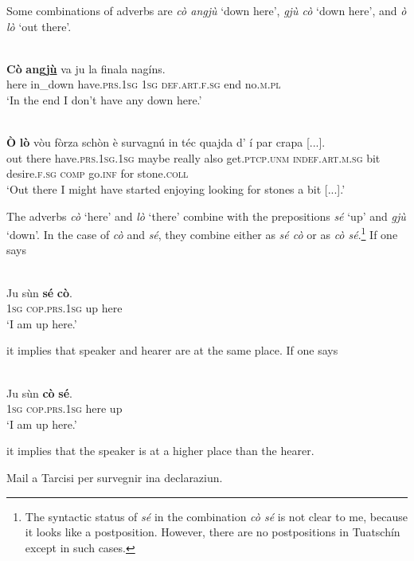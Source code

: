Some combinations of adverbs are \textit{cò angjù} `down here', \textit{gjù cò} `down here', and \textit{ò lò} `out there'.

\ea
\label{}
\\
\gll  \textbf{Cò} \textbf{angj\underline{ù}} va ju la finala nagíns.\\
here in\_down have.\textsc{prs.1sg} \textsc{1sg} \textsc{def.art.f.sg} end no.\textsc{m.pl}  \\
\glt `In the end I don’t have any down here.'
\z

\ea
\label{}
\\
\gll  \textbf{Ò} \textbf{lò} vòu fòrza schòn è survagnú in téc quajda d' í par crapa [...].\\
out there  have.\textsc{prs.1sg.1sg} maybe really also get.\textsc{ptcp.unm} \textsc{indef.art.m.sg} bit desire.\textsc{f.sg} \textsc{comp} go.\textsc{inf} for stone.\textsc{coll}\\
\glt `Out there I might have started enjoying looking for stones a bit [...].'
\z



The adverbs \textit{cò} `here' and \textit{lò} `there' combine with the prepositions \textit{sé} `up' and \textit{gjù} `down'. In the case of \textit{cò} and \textit{sé}, they combine either as \textit{sé cò} or as \textit{cò sé}.\footnote{The syntactic status of \textit{sé} in the combination \textit{cò sé} is not clear to me, because it looks like a postposition. However, there are no postpositions in Tuatschín except in such cases.} If one says

\ea
\label{}
\\
\gll Ju sùn \textbf{sé} \textbf{cò}.\\
\textsc{1sg} \textsc{cop.prs.1sg} up here\\
\glt `I am up here.'
\z

it implies that speaker and hearer are at the same place. If one says

\ea
\label{}
\\
\gll Ju sùn \textbf{cò} \textbf{sé}.\\
\textsc{1sg} \textsc{cop.prs.1sg} here up\\
\glt `I am up here.'
\z

it implies that the speaker is at a higher place than the hearer.

Mail a Tarcisi per survegnir ina declaraziun.

